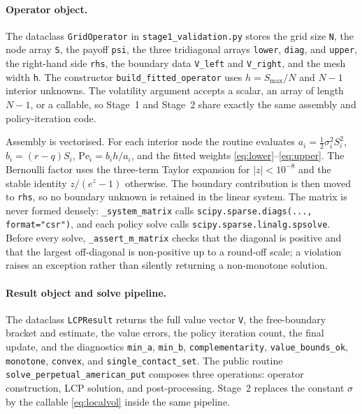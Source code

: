\documentclass[11pt,a4paper]{article}
\theoremstyle{definition}
\theoremstyle{remark}
\begin{document}
\paragraph{Operator object.}
The dataclass \texttt{GridOperator} in \texttt{stage1\_validation.py} stores
the grid size \texttt{N}, the node array \texttt{S}, the payoff
\texttt{psi}, the three tridiagonal arrays \texttt{lower}, \texttt{diag},
and \texttt{upper}, the right-hand side \texttt{rhs}, the boundary data
\texttt{V\_left} and \texttt{V\_right}, and the mesh width \texttt{h}. The
constructor \texttt{build\_fitted\_operator} uses $h=S_{\max}/N$ and
$N-1$ interior unknowns. The volatility argument accepts a scalar, an
array of length $N-1$, or a callable, so Stage~1 and Stage~2 share exactly
the same assembly and policy-iteration code.

Assembly is vectorised. For each interior node the routine evaluates
$a_i=\tfrac12\sigma_i^2S_i^2$, $b_i=(r-q)S_i$,
$\mathrm{Pe}_i=b_ih/a_i$, and the fitted weights
\eqref{eq:lower}--\eqref{eq:upper}. The Bernoulli factor uses the
three-term Taylor expansion for $|z|<10^{-8}$ and the stable identity
$z/(e^z-1)$ otherwise. The boundary contribution is then moved to
\texttt{rhs}, so no boundary unknown is retained in the linear system. The
matrix is never formed densely: \texttt{\_system\_matrix} calls
\texttt{scipy.sparse.diags(..., format="csr")}, and each policy solve calls
\texttt{scipy.sparse.linalg.spsolve}. Before every solve,
\texttt{\_assert\_m\_matrix} checks that the diagonal is positive and that
the largest off-diagonal is non-positive up to a round-off scale; a
violation raises an exception rather than silently returning a
non-monotone solution.

\paragraph{Result object and solve pipeline.}
The dataclass \texttt{LCPResult} returns the full value vector \texttt{V},
the free-boundary bracket and estimate, the value errors, the policy
iteration count, the final update, and the diagnostics
\texttt{min\_a}, \texttt{min\_b}, \texttt{complementarity},
\texttt{value\_bounds\_ok}, \texttt{monotone}, \texttt{convex}, and
\texttt{single\_contact\_set}. The public routine
\texttt{solve\_perpetual\_american\_put} composes three operations:
operator construction, LCP solution, and post-processing. Stage~2 replaces
the constant $\sigma$ by the callable \eqref{eq:localvol} inside the same
pipeline.
\end{document}
